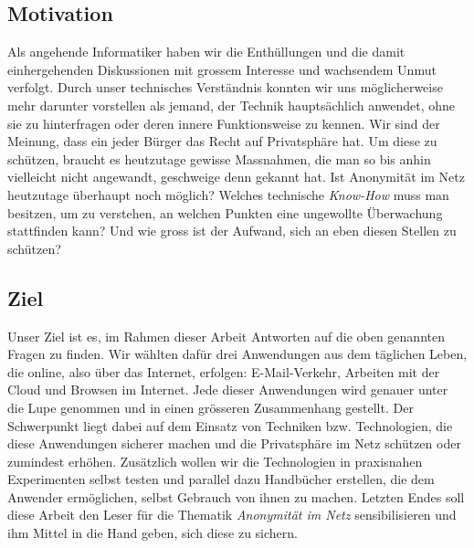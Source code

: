 \subsection{Motivation}
Als angehende Informatiker haben wir die Enthüllungen und die damit einhergehenden Diskussionen mit grossem Interesse und wachsendem Unmut verfolgt. Durch unser technisches Verständnis konnten wir uns möglicherweise mehr darunter vorstellen als jemand, der Technik hauptsächlich anwendet, ohne sie zu hinterfragen oder deren innere Funktionsweise zu kennen. Wir sind der Meinung, dass ein jeder Bürger das Recht auf Privatsphäre hat. Um diese zu schützen, braucht es heutzutage gewisse Massnahmen, die man so bis anhin vielleicht nicht angewandt, geschweige denn gekannt hat. Ist Anonymität im Netz heutzutage überhaupt noch möglich? Welches technische \textit{Know-How} muss man besitzen, um zu verstehen, an welchen Punkten eine ungewollte Überwachung stattfinden kann? Und wie gross ist der Aufwand, sich an eben diesen Stellen zu schützen?

\subsection{Ziel}
Unser Ziel ist es, im Rahmen dieser Arbeit Antworten auf die oben genannten Fragen zu finden. Wir wählten dafür drei Anwendungen aus dem täglichen Leben, die online, also über das Internet, erfolgen: E-Mail-Verkehr, Arbeiten mit der Cloud und Browsen im Internet. Jede dieser Anwendungen wird genauer unter die Lupe genommen und in einen grösseren Zusammenhang gestellt. Der Schwerpunkt liegt dabei auf dem Einsatz von Techniken bzw. Technologien, die diese Anwendungen sicherer machen und die Privatsphäre im Netz schützen oder zumindest erhöhen. Zusätzlich wollen wir die Technologien in praxisnahen Experimenten selbst testen und parallel dazu Handbücher erstellen, die dem Anwender ermöglichen, selbst Gebrauch von ihnen zu machen. Letzten Endes soll diese Arbeit den Leser für die Thematik \textit{Anonymität im Netz} sensibilisieren und ihm Mittel in die Hand geben, sich diese zu sichern.
